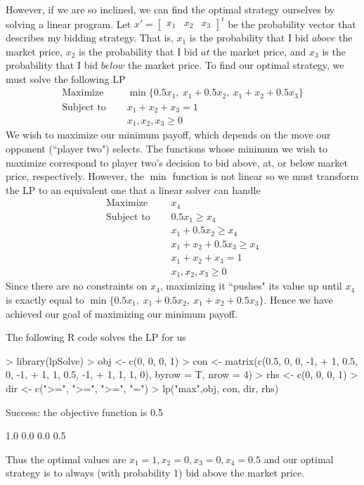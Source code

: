 \documentclass[11pt, oneside]{article}     %
\begin{document}
However, if we are so inclined, we can find the optimal strategy ourselves
by solving a linear program. Let $x' = \begin{bmatrix}x_1 & x_2 & x_3\end{bmatrix}^t$ 
be the probability vector that describes my bidding strategy. 
That is, $x_1$ is  the probability that I bid $above$ the market price, $x_2$ 
is the probability that I bid $at$ the market price, and $x_3$ is the 
probability that I bid $below$ the market price. To find our optimal 
strategy, we must solve the following LP
\begin{align*}
\text{Maximize~~~~}&\min\{0.5x_1,~x_1 +0.5x_2,~x_1 + x_2+0.5x_3\}\\
\text{Subject to~~~~}&x_1 + x_2 + x_3 = 1\\
&x_1, x_2, x_3 \ge 0
\end{align*}
We wish to maximize our minimum payoff, which depends on the move
our opponent (``player two") selects. The functions whose minimum we wish
to maximize correspond to 
player two's decision to bid above, at, or below market price, respectively.
However, the $\min$ function is not linear so we must transform the LP 
to an equivalent one that a linear solver can handle
\begin{align*}
\text{Maximize~~~~}&x_4\\
\text{Subject to~~~~}&0.5x_1 \ge x_4 \\
&x_1 +0.5x_2 \ge x_4\\
&x_1 + x_2+0.5x_3 \ge x_4\\
&x_1 + x_2 + x_3 = 1\\
&x_1, x_2, x_3 \ge 0
\end{align*}
Since there are no constraints on $x_4$, maximizing it ``pushes" its value
up until $x_4$ is exactly equal to 
$\min\{0.5x_1,~x_1 +0.5x_2,~x_1 + x_2+0.5x_3\}$. Hence we have achieved our goal
of maximizing our minimum payoff.

The following R code solves the LP for us
\begin{Schunk}
\begin{Sinput}
> library(lpSolve)
> obj <- c(0, 0, 0, 1)
> con <- matrix(c(0.5, 0, 0, -1,
+                 1, 0.5, 0, -1,
+                 1, 1, 0.5, -1,
+                 1, 1, 1, 0), byrow = T, nrow = 4)
> rhs <- c(0, 0, 0, 1)
> dir <- c(">=", ">=", ">=", "=")
> lp("max",obj, con, dir, rhs)
\end{Sinput}
\begin{Soutput}
Success: the objective function is 0.5 
\end{Soutput}
\begin{Soutput}
[1] 1.0 0.0 0.0 0.5
\end{Soutput}
\end{Schunk}
Thus the optimal values are $x_1 = 1, x_2 = 0, x_3 = 0, 
x_4 = 0.5$ and our optimal strategy is to always (with probability 1) bid 
above the market price.
\end{document}
